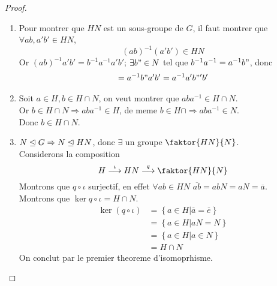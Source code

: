 \documentclass[../main.tex]{subfiles}
\begin{document}
\begin{proof}
\begin{enumerate}
\item Pour montrer que $HN$ est un sous-groupe de $G$, il faut montrer que $\forall ab, a'b' \in HN$,
	\[ 
		( ab)^{-1}( a'b') \in HN
	\]
	Or $( ab) ^{-1}a'b' = b^{-1}a^{-1}a'b'$; $\exists b"\in N$ tel que $b^{-1} a^{-1}= a^{-1}b"$, donc
	\begin{align*}
	= a^{-1}b"a'b' = a^{-1}a' b"'b'
	\end{align*}

\item Soit $a\in H, b \in H\cap N$, on veut montrer que $aba^{-1}\in H\cap N$.\\
	Or $ b\in H\cap N \Rightarrow aba^{-1}\in H$, de meme $b\in H\cap \Rightarrow aba^{-1}\in N$.\\
	Donc $b \in H\cap N$.
\item $N\trianglelefteq G \Rightarrow N \trianglelefteq HN$, donc $\exists$ un groupe $ \faktor {HN} {N} $.\\
	Considerons la composition
	\[ 
	H \oar \iota HN \oar q \faktor {HN} {N} 
	\]
	Montrons que $q\circ \iota$ surjectif, en effet $\forall ab \in HN$ $ \overline{ab}= abN = aN = \overline{a}$.\\
	Montrons que $\ker q\circ \iota = H\cap N$.\\
	\begin{align*}
		\ker ( q\circ \iota) &= \left\{ a\in H | \overline{a}= \overline{e} \right\} \\
		&= \left\{ a\in H | aN = N \right\} \\
		&= \left\{ a\in H | a \in N \right\} \\
		&= H\cap N
	\end{align*}
	On conclut par le premier theoreme d'isomoprhisme.
	
\end{enumerate}

\end{proof}
\end{document}
